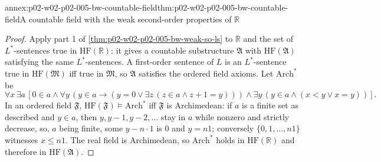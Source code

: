 \begin{annexitem}{annex:p02-w02-p02-005-bw-countable-field}{thm:p02-w02-p02-005-bw-countable-field}{A countable field with the weak second-order properties of \(\mathbb R\)}
\begin{proof}
Apply part 1 of \cref{thm:p02-w02-p02-005-bw-weak-so-ls} to \(\mathbb R\)
and the set of \(L^{*}\)-sentences true in \(\mathrm{HF}(\mathbb R)\): it
gives a countable substructure \(\mathfrak A\) with
\(\mathrm{HF}(\mathfrak A)\) satisfying the same \(L^{*}\)-sentences.  A
first-order sentence of \(L\) is an \(L^{*}\)-sentence true in
\(\mathrm{HF}(\mathfrak M)\) iff true in \(\mathfrak M\), so \(\mathfrak A\)
satisfies the ordered field axioms.  Let \(\mathrm{Arch}^{*}\) be
\[
\forall x\,\exists a\,[0\in a\land\forall y\,(y\in a\to(y=0\lor
\exists z\,(z\in a\land z+1=y)))\land\exists y\,(y\in a\land(x<y\lor x=y))].
\]
In an ordered field \(\mathfrak F\), \(\mathrm{HF}(\mathfrak F)\models\mathrm{Arch}^{*}\)
iff \(\mathfrak F\) is Archimedean: if \(a\) is a finite set as described
and \(y\in a\), then \(y,y-1,y-2,\ldots\) stay in \(a\) while nonzero and
strictly decrease, so, \(a\) being finite, some \(y-n\cdot1\) is \(0\) and
\(y=n1\); conversely \(\{0,1,\ldots,n1\}\) witnesses \(x\leq n1\).  The
real field is Archimedean, so \(\mathrm{Arch}^{*}\) holds in
\(\mathrm{HF}(\mathbb R)\) and therefore in \(\mathrm{HF}(\mathfrak A)\).
\end{proof}
\end{annexitem}

